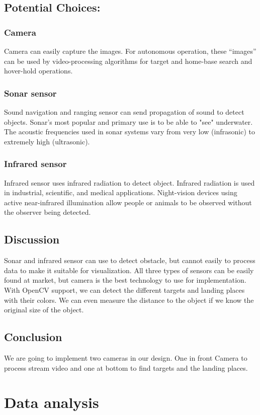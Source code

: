 \documentclass[letterpaper, 10, draftclsnofoot, onecolumn]{IEEEtran}
\begin{document}
\subsection{Potential Choices:}
\subsubsection{Camera}
Camera can easily capture the images. For autonomous operation, these “images” can be used by video-processing algorithms for target and home-base search and hover-hold operations.
\subsubsection{Sonar sensor}
Sound navigation and ranging sensor can send propagation of sound to detect objects. Sonar’s most popular and primary use is to be able to "see" underwater. The acoustic frequencies used in sonar systems vary from very low (infrasonic) to extremely high (ultrasonic).\cite{r1}
\subsubsection{Infrared sensor}
Infrared sensor uses infrared radiation to detect object. Infrared radiation is used in industrial, scientific, and medical applications. Night-vision devices using active near-infrared illumination allow people or animals to be observed without the observer being detected.\cite{r2}
\subsection{Discussion}
Sonar and infrared sensor can use to detect obstacle, but cannot easily to process data to make it suitable for visualization. All three types of sensors can be easily found at market, but camera is the best technology to use for implementation. With OpenCV support, we can detect the different targets and landing places with their colors. We can even measure the distance to the object if we know the original size of the object.
\subsection{Conclusion}
We are going to implement two cameras in our design. One in front Camera to process stream video and one at bottom to find targets and the landing places.

\section{Data analysis}
\end{document}
